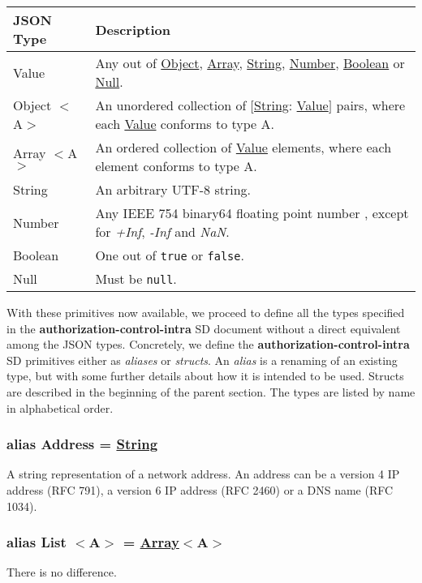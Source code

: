 \documentclass[a4paper]{arrowhead}
\newcommand{\pdef}[1]{{\textcolor{ArrowheadGrey}{#1 \label{sec:model:primitives:#1} \label{sec:model:primitives:#1s}}}}
\newcommand{\pref}[1]{{\textcolor{ArrowheadGrey}{\hyperref[sec:model:primitives:#1]{#1}}}}
\begin{document}
\begin{table}[ht!]
\begin{tabularx}{\textwidth}{| p{3cm} | X |} \hline
\rowcolor{gray!33} JSON Type & Description \\ \hline
\pdef{Value}                 & Any out of \pref{Object}, \pref{Array}, \pref{String}, \pref{Number}, \pref{Boolean} or \pref{Null}. \\ \hline
\pdef{Object}$<$A$>$         & An unordered collection of $[$\pref{String}: \pref{Value}$]$ pairs, where each \pref{Value} conforms to type A. \\ \hline
\pdef{Array}$<$A$>$          & An ordered collection of \pref{Value} elements, where each element conforms to type A. \\ \hline
\pdef{String}                & An arbitrary UTF-8 string. \\ \hline
\pdef{Number}                & Any IEEE 754 binary64 floating point number \cite{cowlishaw2019floating}, except for \textit{+Inf}, \textit{-Inf} and \textit{NaN}. \\ \hline
\pdef{Boolean}               & One out of \texttt{true} or \texttt{false}. \\ \hline
\pdef{Null}                  & Must be \texttt{null}. \\ \hline
\end{tabularx}
\end{table}

With these primitives now available, we proceed to define all the types specified in the \textbf{authorization-control-intra} SD document without a direct equivalent among the JSON types.
Concretely, we define the \textbf{authorization-control-intra} SD primitives either as \textit{aliases} or \textit{structs}.
An \textit{alias} is a renaming of an existing type, but with some further details about how it is intended to be used.
Structs are described in the beginning of the parent section.
The types are listed by name in alphabetical order.

\subsubsection{alias \pdef{Address} = \pref{String}}

A string representation of a network address. An address can be a version 4 IP address (RFC 791), a version 6 IP address (RFC 2460) or a DNS name (RFC 1034).

\subsubsection{alias \pdef{List}$<$A$>$ = \pref{Array}$<$A$>$}
There is no difference.
\end{document}

